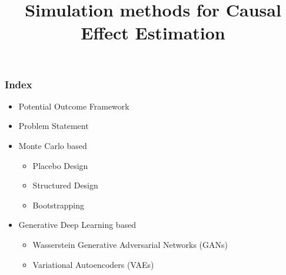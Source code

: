 \documentclass{beamer}
\begin{document}
\title{Simulation methods for Causal Effect Estimation}
\date{}
\maketitle

\begin{frame}
	\frametitle{Index}
	\begin{itemize}
		\item Potential Outcome Framework
		\item Problem Statement
		\item Monte Carlo based
			\begin{itemize}
				\item Placebo Design
				\item Structured Design
				\item Bootstrapping
			\end{itemize}
		\item Generative Deep Learning based
			\begin{itemize}
				\item Wasserstein Generative Adversarial Networks (GANs)
				\item Variational Autoencoders (VAEs)
			\end{itemize}
	\end{itemize}
\end{frame}
\end{document}
